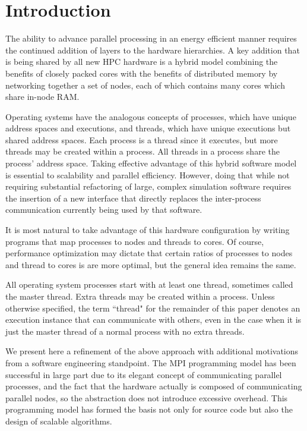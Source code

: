 \documentclass[final,1p,times]{elsarticle}
\begin{document}

\section{Introduction}
\label{sec:intro}

The ability to advance parallel processing in an energy efficient
manner requires the continued addition of layers to the hardware
hierarchies.
A key addition that is being shared by all new
HPC hardware is a hybrid model combining the benefits
of closely packed cores with the benefits of distributed memory
by networking together a set of nodes, each of which contains
many cores which share in-node RAM.

Operating systems have the analogous concepts of processes,
which have unique address spaces and executions, and threads, which
have unique executions but shared address spaces.
Each process is a thread since it executes, but more
threads may be created within a process.
All threads in a process share the process' address space.
Taking effective advantage of this hybrid software model is essential
to scalability and parallel efficiency.
However, doing that while not requiring substantial refactoring
of large, complex simulation software requires the insertion
of a new interface that directly replaces the inter-process communication
currently being used by that software.

It is most natural to take advantage of this hardware
configuration by writing programs that map processes to nodes
and threads to cores.
Of course, performance optimization may dictate that certain
ratios of processes to nodes and thread to cores is are more optimal,
but the general idea remains the same.

All operating system processes start with at least one thread,
sometimes called the master thread.
Extra threads may be created within a process.
Unless otherwise specified, the term ``thread" for the remainder of
this paper denotes an execution instance that can communicate
with others, even in the case when it is just the master
thread of a normal process with no extra threads.

We present here a refinement of the above approach with additional
motivations from a software engineering standpoint.
The MPI programming model has been successful in large part due
to its elegant concept of communicating parallel processes,
and the fact that the hardware actually is composed of communicating parallel
nodes, so the abstraction does not introduce excessive overhead.
This programming model has formed the basis not only for source code
but also the design of scalable algorithms.
\end{document}
